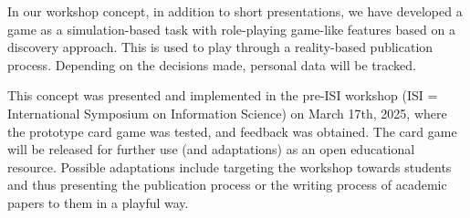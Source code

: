 In our workshop concept, in addition to short presentations, we have
developed a game as a simulation-based task with role-playing game-like
features based on a discovery approach. This is used to play through a
reality-based publication process. Depending on the decisions made,
personal data will be tracked.

This concept was presented and implemented in the pre-ISI workshop (ISI
= International Symposium on Information Science) on March 17th, 2025,
where the prototype card game was tested, and feedback was obtained. The
card game will be released for further use (and adaptations) as an open
educational resource. Possible adaptations include targeting the
workshop towards students and thus presenting the publication process or
the writing process of academic papers to them in a playful way.
